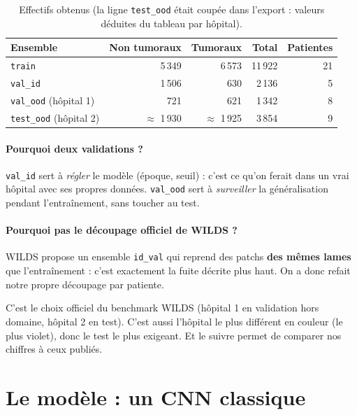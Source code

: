 \documentclass[11pt,a4paper]{article}
\begin{document}
\begin{table}[H]
\centering
\begin{tabular}{lrrrr}
\toprule
\textbf{Ensemble} & \textbf{Non tumoraux} & \textbf{Tumoraux} & \textbf{Total} & \textbf{Patientes} \\
\midrule
\texttt{train} & 5\,349 & 6\,573 & 11\,922 & 21 \\
\texttt{val\_id} & 1\,506 & 630 & 2\,136 & 5 \\
\texttt{val\_ood} (hôpital 1) & 721 & 621 & 1\,342 & 8 \\
\texttt{test\_ood} (hôpital 2) & $\approx$ 1\,930 & $\approx$ 1\,925 & 3\,854 & 9 \\
\bottomrule
\end{tabular}
\caption{Effectifs obtenus (la ligne \texttt{test\_ood} était coupée dans l'export : valeurs déduites du
tableau par hôpital).}
\end{table}

\paragraph{Pourquoi deux validations ?} \texttt{val\_id} sert à \emph{régler} le modèle (époque, seuil) :
c'est ce qu'on ferait dans un vrai hôpital avec ses propres données. \texttt{val\_ood} sert à
\emph{surveiller} la généralisation pendant l'entraînement, sans toucher au test.

\paragraph{Pourquoi pas le découpage officiel de WILDS ?} WILDS propose un ensemble \texttt{id\_val} qui
reprend des patchs \textbf{des mêmes lames} que l'entraînement : c'est exactement la fuite décrite plus haut.
On a donc refait notre propre découpage par patiente.

\begin{oral}
C'est le choix officiel du benchmark WILDS (hôpital 1 en validation hors domaine, hôpital 2 en test). C'est
aussi l'hôpital le plus différent en couleur (le plus violet), donc le test le plus exigeant. Et le suivre
permet de comparer nos chiffres à ceux publiés.
\end{oral}

\section{Le modèle : un CNN classique}
\end{document}
